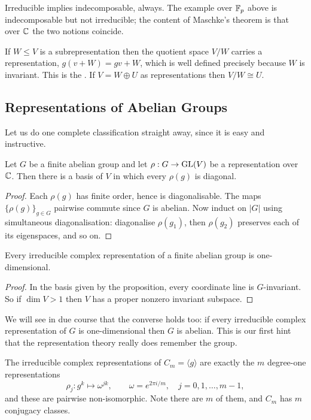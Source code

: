 \documentclass[a4paper]{scrartcl}
\newcommand{\gen}[1]{\langle #1 \rangle}
\begin{document}
Irreducible implies indecomposable, always. The example over $\mathbb{F}_p$ above is indecomposable but not irreducible; the content of Maschke's theorem is that over $\mathbb{C}$ the two notions coincide.

\begin{example}[Quotients]
	If $W \leq V$ is a subrepresentation then the quotient space $V/W$ carries a representation, $g(v + W) = gv + W$, which is well defined precisely because $W$ is invariant. This is the . If $V = W \oplus U$ as representations then $V/W \cong U$.
\end{example}

\subsection{Representations of Abelian Groups}

Let us do one complete classification straight away, since it is easy and instructive.

\begin{proposition}
	Let $G$ be a finite abelian group and let $\rho : G \to \operatorname{GL}(V)$ be a representation over $\mathbb{C}$. Then there is a basis of $V$ in which every $\rho(g)$ is diagonal.
\end{proposition}
\begin{proof}
	Each $\rho(g)$ has finite order, hence is diagonalisable. The maps $\{\rho(g)\}_{g \in G}$ pairwise commute since $G$ is abelian. Now induct on $|G|$ using simultaneous diagonalisation: diagonalise $\rho(g_1)$, then $\rho(g_2)$ preserves each of its eigenspaces, and so on.
\end{proof}

\begin{corollary}
	Every irreducible complex representation of a finite abelian group is one-dimensional.
\end{corollary}
\begin{proof}
	In the basis given by the proposition, every coordinate line is $G$-invariant. So if $\dim V > 1$ then $V$ has a proper nonzero invariant subspace.
\end{proof}

We will see in due course that the converse holds too: if every irreducible complex representation of $G$ is one-dimensional then $G$ is abelian. This is our first hint that the representation theory really does remember the group.

\begin{example}[$C_m$, completely]
	The irreducible complex representations of $C_m = \gen{g}$ are exactly the $m$ degree-one representations
	$$\rho_j : g^k \mapsto \omega^{jk}, \qquad \omega = e^{2\pi i /m}, \quad j = 0, 1, \dots, m-1,$$
	and these are pairwise non-isomorphic. Note there are $m$ of them, and $C_m$ has $m$ conjugacy classes.
\end{example}
\end{document}
